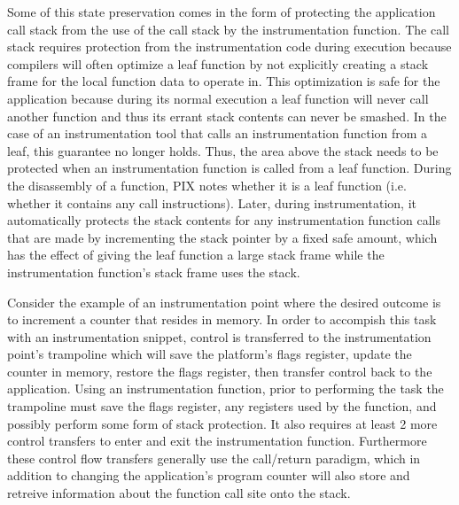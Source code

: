 Some of this state preservation comes in the form of protecting the application call stack from the use of
the call stack by the instrumentation function. The call stack requires protection from the 
instrumentation code during execution because compilers will often optimize a leaf function
by not explicitly creating a stack frame for the local function data to operate in. This optimization is safe for the application because during its
normal execution a leaf function will never call another function and thus its errant stack contents can never be smashed. In the case of an instrumentation
tool that calls an instrumentation function from a leaf, this guarantee no longer holds. Thus, the area above the stack needs to be protected when
an instrumentation function is called from a leaf function. During the disassembly of a function, PIX notes whether it is a leaf function (i.e. whether it contains any call
instructions). Later, during instrumentation, it automatically protects the stack contents for any instrumentation function calls that are made by
incrementing the stack pointer by a fixed safe amount, which has the effect of giving the leaf function a large stack frame while the instrumentation
function's stack frame uses the stack.

Consider the example of an instrumentation point where the desired outcome is to increment a counter that resides in memory. 
In order to accompish this task with an instrumentation snippet, control is transferred to the
instrumentation point's trampoline which will save the platform's flags register, update the counter in memory, restore
the flags register, then transfer control back to the application. Using an instrumentation function, prior to performing
the task the trampoline must save the flags register, any registers used by the function, and
possibly perform some form of stack protection.
It also requires at least 2 more control transfers to enter and exit the instrumentation function. 
Furthermore these control flow transfers generally use the call/return paradigm, which in addition to changing the
application's program counter will also store and retreive information about the function call site onto the stack. 

